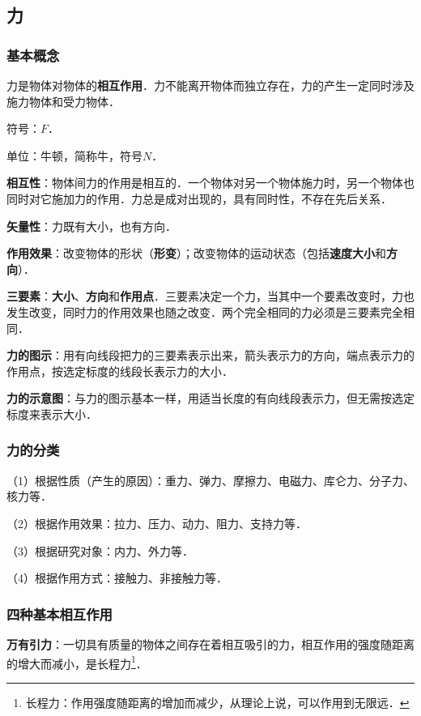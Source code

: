 
\begin{issues}
\issueDraft
\issueTODO
\end{issues}

\subsection{力}
\subsubsection{基本概念}
力是物体对物体的\textbf{相互作用}．力不能离开物体而独立存在，力的产生一定同时涉及施力物体和受力物体．

符号：$F$．

单位：牛顿，简称牛，符号$N$．

\textbf{相互性}：物体间力的作用是相互的．一个物体对另一个物体施力时，另一个物体也同时对它施加力的作用．力总是成对出现的，具有同时性，不存在先后关系．

\textbf{矢量性}：力既有大小，也有方向．

\textbf{作用效果}：改变物体的形状（\textbf{形变}）；改变物体的运动状态（包括\textbf{速度大小}和\textbf{方向}）．

\textbf{三要素}：\textbf{大小}、\textbf{方向}和\textbf{作用点}．三要素决定一个力，当其中一个要素改变时，力也发生改变，同时力的作用效果也随之改变．两个完全相同的力必须是三要素完全相同．

\textbf{力的图示}：用有向线段把力的三要素表示出来，箭头表示力的方向，端点表示力的作用点，按选定标度的线段长表示力的大小．

\textbf{力的示意图}：与力的图示基本一样，用适当长度的有向线段表示力，但无需按选定标度来表示大小．

\subsubsection{力的分类}
（1）根据性质（产生的原因）：重力、弹力、摩擦力、电磁力、库仑力、分子力、核力等．

（2）根据作用效果：拉力、压力、动力、阻力、支持力等．

（3）根据研究对象：内力、外力等．

（4）根据作用方式：接触力、非接触力等．

\subsubsection{四种基本相互作用}
\textbf{万有引力}：一切具有质量的物体之间存在着相互吸引的力，相互作用的强度随距离的增大而减小，是长程力\footnote{长程力：作用强度随距离的增加而减少，从理论上说，可以作用到无限远．}．


